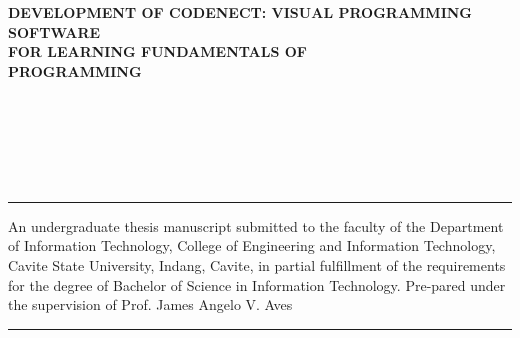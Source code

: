 \begin{center}
	\textbf{
		DEVELOPMENT OF CODENECT: VISUAL PROGRAMMING SOFTWARE\\
		FOR LEARNING FUNDAMENTALS OF\\
		PROGRAMMING}

	\leavevmode\\
	\leavevmode\\

	\thesisautors{}

	\leavevmode\\
	\leavevmode\\

	\hrule
	\parbox{\textwidth}{
	\justify
	An undergraduate thesis manuscript submitted to the faculty of the Department of Information
	Technology, College of Engineering and Information Technology, Cavite State University,
	Indang, Cavite, in partial fulfillment of the requirements for the degree of Bachelor of
	Science in Information Technology. Pre-pared under the supervision of Prof. James Angelo V. Aves}
	\hrule

	\leavevmode\\
	\leavevmode\\
\end{center}
